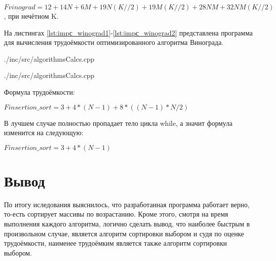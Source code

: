 $Fvinograd = 12+14N+6M+19N(K//2)+19M(K//2)+28NM+32NM(K//2)$,  при нечётном K.

На листингах \ref{lst:impс_winograd1}-\ref{lst:impс_winograd2} представлена программа для вычисления трудоёмкости оптимизированного алгоритма Винограда.

\begin{lstinputlisting}[
	caption={Вычисление трудоёмкости оптимизированного алгоритма Винограда, часть 1},
	label={lst:impс_winograd1},
	style={c},
	linerange={102-102},
	]{./inc/src/algorithmsCalcs.cpp}
\end{lstinputlisting}

\begin{lstinputlisting}[
	caption={Вычисление трудоёмкости оптимизированного алгоритма Винограда, часть 1},
	label={lst:impс_winograd1},
	style={c},
	linerange={102-102},
	]{./inc/src/algorithmsCalcs.cpp}
\end{lstinputlisting}

Формула трудоёмкости:

$Finsertion\_sort = 3 + 4*(N-1) + 8*((N-1)*N/2)$

В лучшем случае полностью пропадает тело цикла while, а значит формула изменится на следующую:

$Finsertion\_sort = 3 + 4*(N-1)$

\section{Вывод}
По итогу иследования выяснилось, что разработанная программа работает верно, то-есть сортирует массивы по возрастанию. Кроме этого, смотря на время выполнения каждого алгоритма, логично сделать вывод, что наиболее быстрым в произвольном случае, является алгоритм сортировки выбором и судя по оценке трудоёмкости, наименее трудоёмким является также алгоритм сортировки выбором.